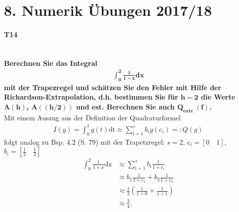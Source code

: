 \documentclass[10pt,a4paper]{article}
\begin{document}
	\section*{8. Numerik Übungen 2017/18}
	\paragraph{T14}\mbox{}\\
	\textbf{%
		Berechnen Sie das Integral
		\begin{align*}
			\mathbf{\int_{0}^{2}\frac{1}{1+x}\text{dx}}
		\end{align*}
		mit der Trapezregel und schätzen Sie den Fehler mit Hilfe der Richardson-Extrapolation, d.h. bestimmen Sie für $\pmb{h=2}$ die Werte $\pmb{A(h)}$, $\pmb{A((h/2))}$ und est. Berechnen Sie auch $\pmb{Q_\text{extr.}(f)}$.
	}\\
	Mit einem Auszug aus der Definition der Quadraturformel
	\begin{align*}\tag{(4.12)}
		I(g)=\int_{0}^{1}g(t)\text{dt} \approx \sum_{\text{i}=1}^{s}b_ig(c_i)=:Q(g)
	\end{align*}
	folgt analog zu Bsp. 4.2 (S. 79) mit der Trapetzregel: $s = 2$, $c_i=[0 \quad 1]$, $b_i = [\frac{1}{2} \quad \frac{1}{2}]$
	\begin{align*}
		\int_{0}^{2}\frac{1}{1+x}\text{dx} &\approx \sum_{\text{i}=1}^{s} b_i \frac{1}{1+c_i}\\
		 & \approx b_1 \frac{1}{1+c_1}+ b_2 \frac{1}{1+c_2} \\
		 & \approx \frac{1}{2} \left( \frac{1}{1+0}+ \frac{1}{1+1} \right) \\
		 & \approx \frac{3}{4}.
	\end{align*}
	
\end{document}
